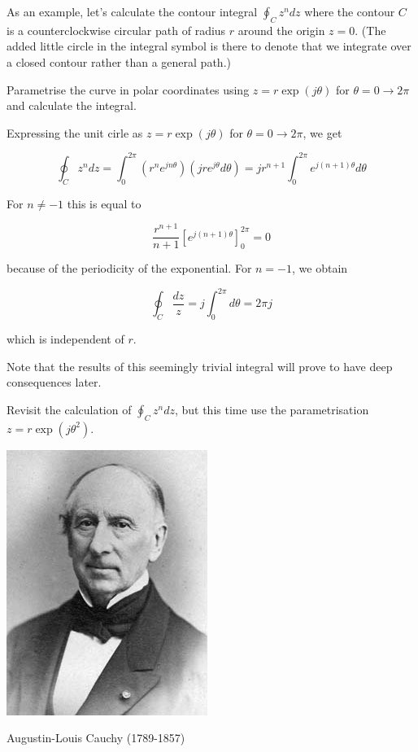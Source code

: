 As an example, let's calculate the contour integral $\oint_{C}z^ndz$ where the contour ${C}$ is a counterclockwise circular path of radius $r$ around the origin $z=0$. (The added little circle in the integral symbol is there to denote that we integrate over a closed contour rather than a general path.)

\begin{cue}
Parametrise the curve in polar coordinates using $z=r\exp(j\theta)$ for $\theta=0\to 2 \pi$ and calculate the integral. 
\end{cue}

Expressing the unit cirle as $z=r\exp(j\theta)$ for $\theta=0\to 2 \pi$, we get

$$\oint_{C} z^n dz = \int_0^{2\pi} \left(r^n e^{jn\theta}\right) \left(jr e^{j \theta}d \theta\right)=j r^{n+1} \int_0^{2\pi} e^{j(n+1)\theta} d \theta $$

For $n \neq -1$ this is equal to

$$ \frac{r^{n+1}}{n+1}\left[e^{j(n+1)\theta}\right]_0^{2\pi}=0 $$

because of the periodicity of the exponential. For $n=-1$, we obtain 

$$ \oint_{C} \frac{dz}{z} = j \int_0^{2\pi} d \theta = 2 \pi j $$

which is independent of $r$.

Note that the results of this seemingly trivial integral will prove to have deep consequences later.

\begin{exer}
Revisit the calculation of  $\oint_{C}z^ndz$, but this time use the parametrisation  $z=r\exp(j\theta^2)$. 
\end{exer}


\pagebreak



\begin{marginfigure}[+0.3cm]
  \includegraphics{complex/figures/cauchy}
  \caption{Augustin-Louis Cauchy (1789-1857)}
\end{marginfigure}

